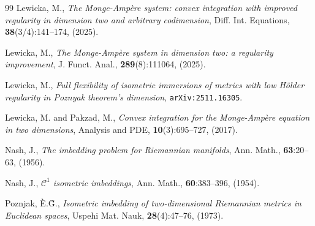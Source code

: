 \documentclass[reqno,twoside,11pt]{amsart}
\numberwithin{equation}{section}
\theoremstyle{plain}
\theoremstyle{definition}
\begin{document}
\begin{thebibliography}{99}
 {\sc Lewicka, M.},
{\em The Monge-Amp\`ere system: convex integration with
  improved regularity in dimension two and arbitrary codimension},
Diff. Int. Equations, {\bf 38}(3/4):141--174, (2025). 

 {\sc Lewicka, M.},
{\em The Monge-Amp\`ere system in dimension two: a regularity
  improvement}, J. Funct. Anal., {\bf 289}(8):111064, (2025).

 {\sc Lewicka, M.},
{\em Full flexibility of isometric immersions of metrics with low H\"older
  regularity in Poznyak theorem's dimension}, {\tt arXiv:2511.16305}.

 {\sc Lewicka, M.  and Pakzad, M.},
{\em Convex integration for the Monge-Amp\`ere equation in two
  dimensions}, Analysis and PDE, {\bf 10}(3):695--727, (2017).

 {\sc Nash, J.}, {\em The imbedding problem for Riemannian
    manifolds}, Ann. Math., {\bf 63}:20--63, (1956).

 {\sc Nash, J.}, {\em $\mathcal{C}^1$ isometric
    imbeddings}, Ann. Math., {\bf 60}:383--396, (1954).

 {\sc Poznjak, \`E.\~G.},
{\em Isometric imbedding of two-dimensional {R}iemannian metrics in {E}uclidean spaces}, 
 Uspehi Mat. Nauk, {\bf 28}(4):47--76, (1973).

\end{thebibliography}
\end{document}
